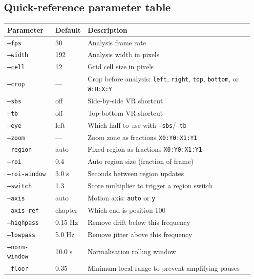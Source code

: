 \documentclass[11pt,a4paper]{article}
\newcommand{\code}[1]{\texttt{#1}}
\begin{document}
\subsection{Quick-reference parameter table}

\begin{center}
\begin{tabular}{llp{6.5cm}}
  \toprule
  Parameter & Default & Description \\
  \midrule
  \code{--fps}           & 30          & Analysis frame rate \\
  \code{--width}         & 192         & Analysis width in pixels \\
  \code{--cell}          & 12          & Grid cell size in pixels \\
  \code{--crop}          & ---         & Crop before analysis: \code{left}, \code{right}, \code{top}, \code{bottom}, or \code{W:H:X:Y} \\
  \code{--sbs}           & off         & Side-by-side VR shortcut \\
  \code{--tb}            & off         & Top-bottom VR shortcut \\
  \code{--eye}           & left        & Which half to use with \code{--sbs}/\code{--tb} \\
  \code{--zoom}          & ---         & Zoom zone as fractions \code{X0:Y0:X1:Y1} \\
  \code{--region}        & auto        & Fixed region as fractions \code{X0:Y0:X1:Y1} \\
  \code{--roi}           & 0.4         & Auto region size (fraction of frame) \\
  \code{--roi-window}    & 3.0 s       & Seconds between region updates \\
  \code{--switch}        & 1.3         & Score multiplier to trigger a region switch \\
  \code{--axis}          & auto        & Motion axis: \code{auto} or \code{y} \\
  \code{--axis-ref}      & chapter     & Which end is position 100 \\
  \code{--highpass}      & 0.15 Hz     & Remove drift below this frequency \\
  \code{--lowpass}       & 5.0 Hz      & Remove jitter above this frequency \\
  \code{--norm-window}   & 10.0 s      & Normalisation rolling window \\
  \code{--floor}         & 0.35        & Minimum local range to prevent amplifying pauses \\

\end{tabular}
\end{center}
\end{document}
